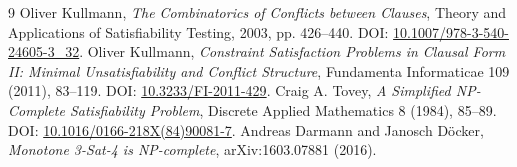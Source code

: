 \documentclass[10pt]{article}
\begin{document}
\begin{thebibliography}{9}
 Oliver Kullmann, \emph{The Combinatorics of Conflicts between Clauses}, Theory and Applications of Satisfiability Testing, 2003, pp. 426--440. DOI: \href{https://doi.org/10.1007/978-3-540-24605-3_32}{10.1007/978-3-540-24605-3\_32}.
 Oliver Kullmann, \emph{Constraint Satisfaction Problems in Clausal Form II: Minimal Unsatisfiability and Conflict Structure}, Fundamenta Informaticae 109 (2011), 83--119. DOI: \href{https://doi.org/10.3233/FI-2011-429}{10.3233/FI-2011-429}.
 Craig A. Tovey, \emph{A Simplified NP-Complete Satisfiability Problem}, Discrete Applied Mathematics 8 (1984), 85--89. DOI: \href{https://doi.org/10.1016/0166-218X(84)90081-7}{10.1016/0166-218X(84)90081-7}.
 Andreas Darmann and Janosch D\"ocker, \emph{Monotone 3-Sat-4 is NP-complete}, arXiv:1603.07881 (2016).
\end{thebibliography}
\end{document}
